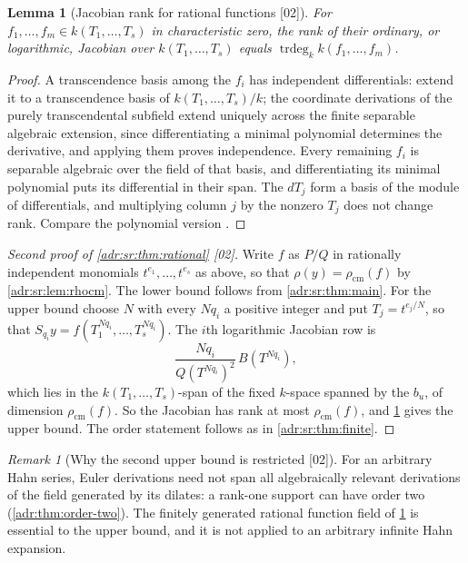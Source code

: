 \documentclass[11pt,letterpaper]{article}
\numberwithin{equation}{section}
\newtheorem{lemma}[lemma]{Lemma}
\theoremstyle{definition}
\theoremstyle{remark}
\newtheorem{remark}[remark]{Remark}
\newcommand{\trdeg}{\operatorname{trdeg}}
\newcommand{\src}[1]{\textup{[#1]}}%
\begin{document}
\begin{lemma}[Jacobian rank for rational functions \src{02}]
\label{adr:sr:lem:jacobianrank}
For $f_1,\ldots,f_m\in k(T_1,\ldots,T_s)$ in characteristic zero, the rank of
their ordinary, or logarithmic, Jacobian over $k(T_1,\ldots,T_s)$ equals
$\trdeg_kk(f_1,\ldots,f_m)$.
\end{lemma}
\begin{proof}
A transcendence basis among the $f_i$ has independent differentials: extend it
to a transcendence basis of $k(T_1,\ldots,T_s)/k$; the coordinate derivations
of the purely transcendental subfield extend uniquely across the finite
separable algebraic extension, since differentiating a minimal polynomial
determines the derivative, and applying them proves independence. Every
remaining $f_i$ is separable algebraic over the field of that basis, and
differentiating its minimal polynomial puts its differential in their span.
The $dT_j$ form a basis of the module of differentials, and multiplying column
$j$ by the nonzero $T_j$ does not change rank. Compare the polynomial version
\cite[Theorem~6]{BMS}.
\end{proof}

\begin{proof}[Second proof of \cref{adr:sr:thm:rational} \src{02}]
Write $f$ as $P/Q$ in rationally independent monomials $t^{e_1},\ldots,t^{e_s}$
as above, so that $\rho(y)=\rho_{\mathrm{cm}}(f)$ by \cref{adr:sr:lem:rhocm}.
The lower bound follows from \cref{adr:sr:thm:main}. For the upper bound choose
$N$ with every $Nq_i$ a positive integer and put $T_j=t^{e_j/N}$, so that
$S_{q_i}y=f(T_1^{Nq_i},\ldots,T_s^{Nq_i})$. The $i$th logarithmic Jacobian row
is
\[
 \frac{Nq_i}{Q(T^{Nq_i})^2}\,B(T^{Nq_i}),
\]
which lies in the $k(T_1,\ldots,T_s)$-span of the fixed $k$-space spanned by
the $b_u$, of dimension $\rho_{\mathrm{cm}}(f)$. So the Jacobian has rank at
most $\rho_{\mathrm{cm}}(f)$, and \cref{adr:sr:lem:jacobianrank} gives the upper
bound. The order statement follows as in \cref{adr:sr:thm:finite}.
\end{proof}

\begin{remark}[Why the second upper bound is restricted \src{02}]
For an arbitrary Hahn series, Euler derivations need not span all
algebraically relevant derivations of the field generated by its dilates: a
rank-one support can have order two (\cref{adr:thm:order-two}). The
finitely generated rational function field of \cref{adr:sr:lem:jacobianrank}
is essential to the upper bound, and it is not applied to an arbitrary infinite
Hahn expansion.
\end{remark}
\end{document}
